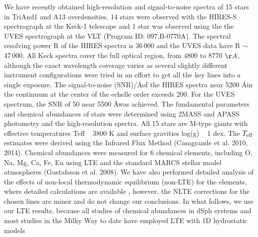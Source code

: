 \documentclass[galaxies,article,submit,moreauthors,pdftex,10pt,a4paper]{mdpi}
\begin{document}
We have recently obtained high-resolution and signal-to-noise spectra of 15 stars in TriAnd1 and A13 overdensities. 14 stars were observed with the HIRES-S spectrograph at the Keck-1 telescope \cite{vogt1994} and 1 star was observed using the the UVES spectrograph at the VLT (Program ID: 097.B-0770A). The spectral resolving power R of the HIRES spectra is 36\,000 and the UVES data have R $\sim$ 47\,000. All Keck spectra cover the full optical region, from $4800$ to $8770$ $\AA$, although the exact wavelength coverage varies as several slightly different instrument configurations were tried in an effort to get all the key lines into a single exposure. The signal-to-noise (SNR)/\AA of the HIRES spectra near 5200 \AA in the continuum at the center of the echelle order exceeds 200. For the UVES spectrum, the SNR of 50 near 5500 \AA was achieved. The fundamental parameters and chemical abundances of stars were determined using 2MASS and APASS photometry and the high-resolution spectra. All 15 stars are M-type giants with effective temperatures Teff ~ 3800 K and surface gravities log(g) ~ 1 dex. The $T_{\rm eff}$ estimates were derived using the Infrared Flux Method (Casagrande et al. 2010, 2014). Chemical abundances were measured for 6 chemical elements, including O, Na, Mg, Ca, Fe, Eu using LTE and the standard MARCS stellar model atmospheres (Gustafsson et al. 2008). We have also performed detailed analysis of the effects of non-local thermodynamic equilibrium (non-LTE) for the elements, where detailed calculations are available \cite{bergemann2011, bergemann2012, bergemann2016}, however, the NLTE corrections for the chosen lines are minor and do not change our conclusions. In what follows, we use our LTE results, because all studies of chemical abundances in dSph systems and most studies in the Milky Way to date have employed LTE with 1D hydrostatic models
\end{document}
